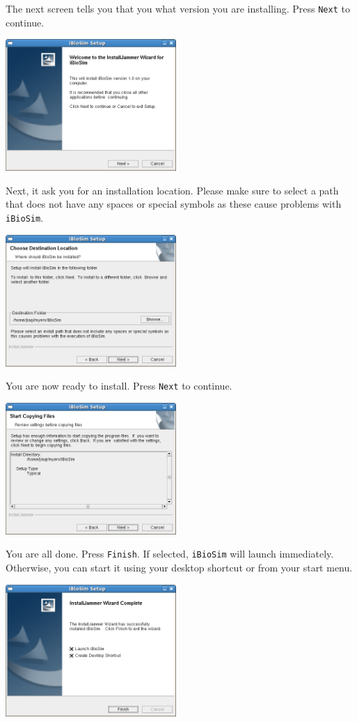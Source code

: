 \documentclass[titlepage,11pt]{article}
\begin{document}
The next screen tells you that you what version you are installing.
Press {\tt Next} to continue.

\includegraphics[height=50mm]{screenshots/setup}

Next, it ask you for an installation location.  Please make sure to
select a path that does not have any spaces or special symbols as
these cause problems with {\tt iBioSim}.

\includegraphics[height=50mm]{screenshots/location}

You are now ready to install.  Press {\tt Next} to continue.

\includegraphics[height=50mm]{screenshots/confirm}

You are all done.  Press {\tt Finish}.  If selected, {\tt iBioSim}
will launch immediately.  Otherwise, you can start it using your
desktop shortcut or from your start menu.

\includegraphics[height=50mm]{screenshots/finish}
\end{document}
